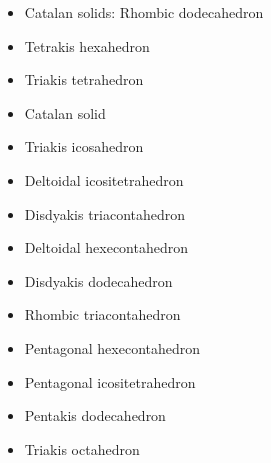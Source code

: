 \begin{itemize}
\item Catalan solids: Rhombic dodecahedron 
\item Tetrakis hexahedron 
\item Triakis tetrahedron 
\item Catalan solid 
\item Triakis icosahedron 
\item Deltoidal icositetrahedron 
\item Disdyakis triacontahedron 
\item Deltoidal hexecontahedron 
\item Disdyakis dodecahedron 
\item Rhombic triacontahedron 
\item Pentagonal hexecontahedron 
\item Pentagonal icositetrahedron 
\item Pentakis dodecahedron 
\item Triakis octahedron 
\end{itemize}
